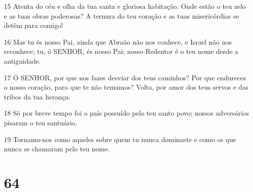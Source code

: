 \par 15 Atenta do céu e olha da tua santa e gloriosa habitação. Onde estão o teu zelo e as tuas obras poderosas? A ternura do teu coração e as tuas misericórdias se detêm para comigo!
\par 16 Mas tu és nosso Pai, ainda que Abraão não nos conhece, e Israel não nos reconhece; tu, ó SENHOR, és nosso Pai; nosso Redentor é o teu nome desde a antiguidade.
\par 17 Ó SENHOR, por que nos fazes desviar dos teus caminhos? Por que endureces o nosso coração, para que te não temamos? Volta, por amor dos teus servos e das tribos da tua herança.
\par 18 Só por breve tempo foi o país possuído pelo teu santo povo; nossos adversários pisaram o teu santuário.
\par 19 Tornamo-nos como aqueles sobre quem tu nunca dominaste e como os que nunca se chamaram pelo teu nome.

\chapter{64}

